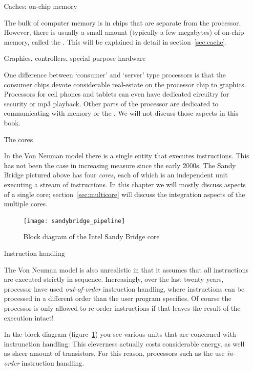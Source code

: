  {Caches: on-chip memory}

The bulk of computer memory is in chips that are separate from the processor.
However, there is usually a small amount (typically a few megabytes)
of on-chip memory, called the . This will be 
explained in detail in section~\ref{sec:cache}.

 {Graphics, controllers, special purpose hardware}

One difference between `consumer' and `server' type processors
is that the consumer chips devote considerable real-estate
on the processor chip to graphics. Processors for cell phones and tablets
can even have dedicated circuitry for security or mp3 playback.
Other parts of the processor
are dedicated to communicating with memory or the .
We will not discuss those aspects in this book.

 {The cores}

In the Von Neuman model there is a single entity that executes instructions.
This has not been the case in increasing measure since the early 2000s.
The Sandy Bridge pictured above has four \emph{cores}, each of which
is an independent unit executing a stream of instructions.
In this chapter we will mostly discuss aspects of a single core; 
section~\ref{sec:multicore} will discuss the integration aspects 
of the multiple cores.

\begin{figure}[ht]
  \texttt{[image: sandybridge\_pipeline]}
  \caption{Block diagram of the Intel Sandy Bridge core}
  \label{fig:sandycore}
\end{figure}

 {Instruction handling}

 The Von
Neuman model is also unrealistic in that it assumes that all
instructions are executed strictly in sequence.  Increasingly, over
the last twenty years, processor have used
\emph{out-of-order}
instruction handling, where instructions can be processed
in a different order than the user program specifies. 
Of course the processor is only allowed to re-order instructions
if that leaves the result of the execution intact!

In the block diagram (figure~\ref{fig:sandycore}) you see various
units that are concerned with instrunction handling: This cleverness
actually costs considerable energy, as well as sheer amount of
transistors. For this reason, processors such as the
 use
\emph{in-order} instruction
handling.

